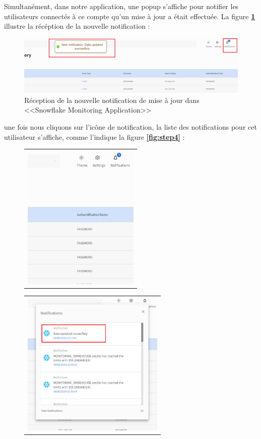 \begin{itemize}
        \par Simultanément, dans notre application, une popup s'affiche pour notifier les utilisateurs connectés à ce compte qu'un mise à jour a était effectuée.
        La figure \textbf{\ref{fig:step3}} illustre la récéption de la nouvelle notification : 
        \begin{figure}[H]
            \centering
            \includegraphics[width =1\linewidth]{img/captures/notifications/new_update.png}
            \caption{Réception de la nouvelle notification de mise à jour dans <<Snowflake Monitoring Application>>}
            \label{fig:step3}
        \end{figure}
        \par une fois nous cliquons sur l'icône de notification, la liste des notifications pour cet utilisateur s'affiche, comme l'indique la figure \textbf{\ref{fig:step4}} : 
        \begin{figure}[H]
            \centering
            \begin{tabular}[b]{c}
            \includegraphics[width=0.3\linewidth ,height=7cm]{img/captures/notifications/notif.png} \\
            
            \end{tabular} 
            \begin{tabular}[b]{c}
            \includegraphics[width=0.3\linewidth ,height=7cm]{img/captures/notifications/update2.png} \\
            

\end{tabular}
\end{figure}
\end{itemize}
